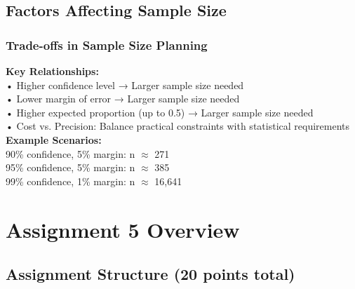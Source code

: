 \documentclass[11pt,a4paper]{article}
\begin{document}
\subsection{Factors Affecting Sample Size}

\subsubsection{Trade-offs in Sample Size Planning}

\begin{estimationbox}
\textbf{Key Relationships:}\\
• Higher confidence level → Larger sample size needed\\
• Lower margin of error → Larger sample size needed\\
• Higher expected proportion (up to 0.5) → Larger sample size needed\\
• Cost vs. Precision: Balance practical constraints with statistical requirements\\[0.3cm]
\textbf{Example Scenarios:}\\
90\% confidence, 5\% margin: n $\approx$ 271\\
95\% confidence, 5\% margin: n $\approx$ 385\\
99\% confidence, 1\% margin: n $\approx$ 16,641
\end{estimationbox}

\section{Assignment 5 Overview}

\subsection{Assignment Structure (20 points total)}
\end{document}
